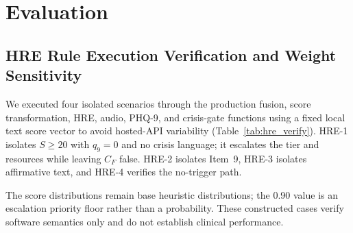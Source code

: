 \documentclass[10pt, conference, letterpaper]{IEEEtran}
\begin{document}
\section{Evaluation}
\label{sec:eval}

\subsection{HRE Rule Execution Verification and Weight Sensitivity}

We executed four isolated scenarios through the production fusion, score
transformation, HRE, audio, PHQ-9, and crisis-gate functions using a fixed local
text score vector to avoid hosted-API variability (Table~\ref{tab:hre_verify}).
HRE-1 isolates $S\ge20$ with $q_9=0$ and no crisis language; it escalates the
tier and resources while leaving $C_F$ false. HRE-2 isolates Item~9, HRE-3
isolates affirmative text, and HRE-4 verifies the no-trigger path.

\begin{table}[!t]
\caption{HRE Verification: Adversarial Masking Scenarios}
\label{tab:hre_verify}
\centering
{}
\end{table}

The score distributions remain base heuristic distributions; the 0.90 value is
an escalation priority floor rather than a probability. These constructed cases
verify software semantics only and do not establish clinical performance.
\end{document}
